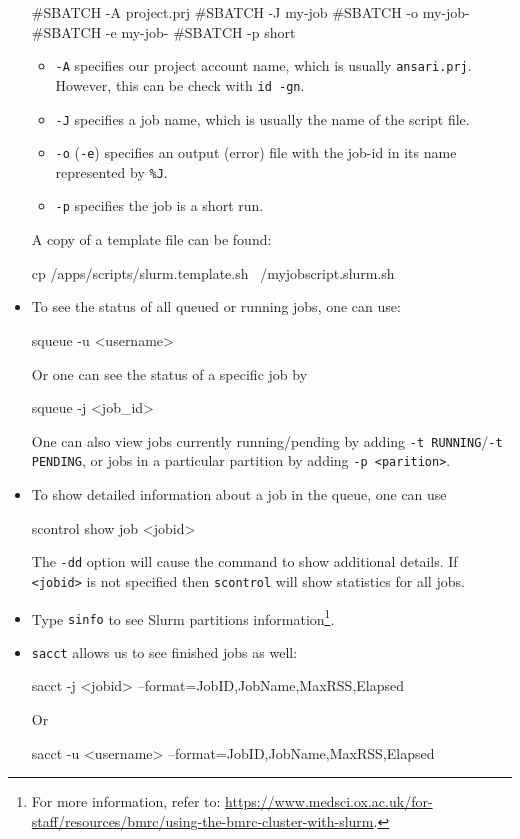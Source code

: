 \documentclass[UTF8]{book}
\newcommand{\code}[1]{\colorbox{codegray}{\texttt{#1}}}
\begin{document}
\begin{itemize}
\begin{bash}
#SBATCH -A project.prj 
#SBATCH -J my-job 
#SBATCH -o my-job-%
#SBATCH -e my-job-%
#SBATCH -p short 
\end{bash}
\begin{itemize}
	\item \code{-A} specifies our project account name, which is usually \code{ansari.prj}. However, this can be check with \code{id -gn}.
	\item \code{-J} specifies a job name, which is usually the name of the script file.
	\item \code{-o} (\code{-e}) specifies an output (error) file with the job-id in its name represented by \code{\%J}.
	\item \code{-p} specifies the job is a short run.
\end{itemize}
A copy of a template file can be found:
\begin{bash}
cp /apps/scripts/slurm.template.sh ~/myjobscript.slurm.sh
\end{bash}
\item To see the status of all queued or running jobs, one can use:
\begin{bash}
squeue -u <username>
\end{bash}
Or one can see the status of a specific job by
\begin{bash}
squeue -j <job_id>
\end{bash}
One can also view jobs currently running/pending by adding \code{-t RUNNING}/\code{-t PENDING}, or jobs in a particular partition by adding \code{-p <parition>}.
\item To show detailed information about a job in the queue, one can use
\begin{bash}
scontrol show job <jobid>
\end{bash}
The \code{-dd} option will cause the command to show additional details. If \code{<jobid>} is not specified then \code{scontrol} will show statistics for all jobs.
\item Type \code{sinfo} to see Slurm partitions information\footnote{For more information, refer to: \url{https://www.medsci.ox.ac.uk/for-staff/resources/bmrc/using-the-bmrc-cluster-with-slurm}.}.
\item \code{sacct} allows us to see finished jobs as well:
\begin{bash}
sacct -j <jobid> --format=JobID,JobName,MaxRSS,Elapsed
\end{bash}
Or
\begin{bash}
sacct -u <username> --format=JobID,JobName,MaxRSS,Elapsed

\end{bash}
\end{itemize}
\end{document}

